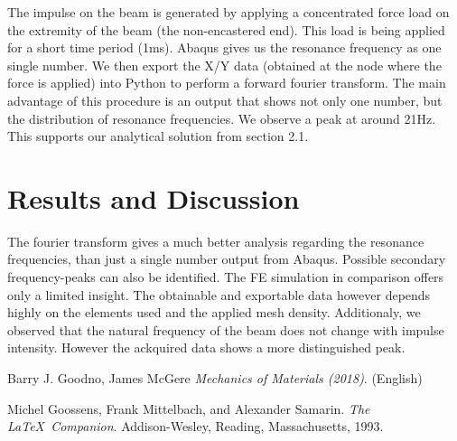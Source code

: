 \documentclass[12pt]{article}
\begin{document}
\noindent The impulse on the beam is generated by applying a concentrated force load on the extremity of 
the beam (the non-encastered end).
This load is being applied for a short time period (1ms). Abaqus gives us the resonance frequency as one single number. 
We then export the X/Y data (obtained at the node where the force is applied) 
into Python to perform a forward fourier transform.
The main advantage of this procedure is an output that shows not only one number, 
but the distribution of resonance frequencies. We observe a peak at around 21Hz. 
This supports our analytical solution from section 2.1.


\section{Results and Discussion}

The fourier transform gives a much better analysis regarding the resonance frequencies,
than just a single number output from Abaqus. 
Possible secondary frequency-peaks can also be identified. The FE simulation in comparison offers 
only a limited insight. The obtainable and exportable data however depends highly on the
elements used and the applied mesh density.
Additionaly, we observed that the natural frequency of the beam does not change with impulse intensity\cite{natural frequencies}.
However the ackquired data shows a more distinguished peak. 


\pagebreak
\begin{thebibliography}{9}

  
  Barry J. Goodno, James McGere
  \textit{Mechanics of Materials (2018)}. (English)  

  Michel Goossens, Frank Mittelbach, and Alexander Samarin. 
  \textit{The \LaTeX\ Companion}. 
  Addison-Wesley, Reading, Massachusetts, 1993.
\end{thebibliography}
\end{document}
